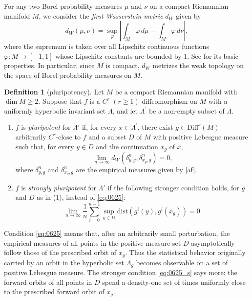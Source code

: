 \documentclass{amsart}
\theoremstyle{definition}
\newtheorem{dfn}[thm]{Definition}
\numberwithin{equation}{section}
\numberwithin{figure}{section}
\begin{document}
For any two Borel probability measures $\mu$ and $\nu$ on a compact Riemannian manifold $M$, 
we consider the \emph{first Wasserstein metric} $d_W$ given by
\[
d_W(\mu ,\nu )= \sup_\varphi \left\vert \int _M \varphi \, d\mu - \int _M \varphi \, d\nu \right\vert,
\]
where the supremum is taken over all Lipschitz continuous functions $\varphi : M \longrightarrow [-1, 1]$ whose Lipschitz constants are bounded by $1$. 
See \cite{V09} for its basic properties. In particular, 
since $M$ is compact, $d_W$ metrizes the weak topology on the space of Borel probability measures on $M$.



\begin{dfn}[pluripotency]\label{dfn:0624}
Let $M$ be a compact Riemannian manifold with $\dim M\geq 2$.
Suppose that $f$ is a $C^{r}$ $(r\geq 1)$ diffeomorphism on $M$ with 
a uniformly hyperbolic invariant set $\Lambda$, and let $\Lambda^{\prime}$ be a non-empty subset of $\Lambda$. 
\begin{enumerate}[(1)]
\item
$f$ is \emph{pluripotent} for $\Lambda'$ if, for every $x\in \Lambda^{\prime}$, 
there exist $g\in \mathrm{Diff}^r(M)$ arbitrarily $C^r$-close to $f$ 
and a subset $D$ of $M$ with positive Lebesgue measure
such that, for every $y\in D$ and the continuation $x_g$ of $x$,
\begin{equation}\label{eq:0625}
\lim _{n\rightarrow \infty} d_W( \delta_{y,g}^n, \delta_{x_g,g}^n) =0,
\end{equation}
where $\delta_{y,g}^n$ and $\delta_{x_g,g}^n$ are the empirical measures given by \eqref{af}.
\item  
$f$ is \emph{strongly pluripotent} for $\Lambda'$ if the following stronger condition holds, for $g$ and $D$ as in (1), instead of \eqref{eq:0625}:  
\begin{equation}\label{eq:0625_s}
\lim _{n\rightarrow \infty} \frac1{n}\sum_{i=0}^{n-1}
\sup_{y\in D}\mathrm{dist}(g^i(y),g^i(x_g))=0.
\end{equation}
\end{enumerate}
\end{dfn}

Condition \eqref{eq:0625} means that, after an arbitrarily small perturbation, 
the empirical measures of all points in the positive-measure set $D$ asymptotically follow those of the prescribed orbit of $x_g$. 
Thus the statistical behavior originally carried by an orbit in the hyperbolic set $\Lambda_g$ becomes observable on a set of positive Lebesgue measure. 
The stronger condition \eqref{eq:0625_s} says more: the forward orbits of all points in $D$ spend a density-one set of times uniformly close to the prescribed forward orbit of $x_g$.
\end{document}
